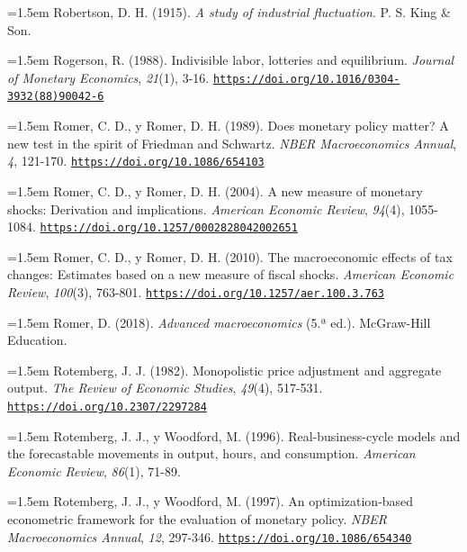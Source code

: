 \documentclass[10pt,a4paper]{article}
\begin{document}
\noindent\hangindent=1.5em Robertson, D. H. (1915). \textit{A study of industrial fluctuation}. P. S. King \& Son.

\noindent\hangindent=1.5em Rogerson, R. (1988). Indivisible labor, lotteries and equilibrium. \textit{Journal of Monetary Economics}, \textit{21}(1), 3-16. \href{https://doi.org/10.1016/0304-3932(88)90042-6}{\nolinkurl{https://doi.org/10.1016/0304-3932(88)90042-6}}

\noindent\hangindent=1.5em Romer, C. D., y Romer, D. H. (1989). Does monetary policy matter? A new test in the spirit of Friedman and Schwartz. \textit{NBER Macroeconomics Annual}, \textit{4}, 121-170. \href{https://doi.org/10.1086/654103}{\nolinkurl{https://doi.org/10.1086/654103}}

\noindent\hangindent=1.5em Romer, C. D., y Romer, D. H. (2004). A new measure of monetary shocks: Derivation and implications. \textit{American Economic Review}, \textit{94}(4), 1055-1084. \href{https://doi.org/10.1257/0002828042002651}{\nolinkurl{https://doi.org/10.1257/0002828042002651}}

\noindent\hangindent=1.5em Romer, C. D., y Romer, D. H. (2010). The macroeconomic effects of tax changes: Estimates based on a new measure of fiscal shocks. \textit{American Economic Review}, \textit{100}(3), 763-801. \href{https://doi.org/10.1257/aer.100.3.763}{\nolinkurl{https://doi.org/10.1257/aer.100.3.763}}

\noindent\hangindent=1.5em Romer, D. (2018). \textit{Advanced macroeconomics} (5.ª ed.). McGraw-Hill Education.

\noindent\hangindent=1.5em Rotemberg, J. J. (1982). Monopolistic price adjustment and aggregate output. \textit{The Review of Economic Studies}, \textit{49}(4), 517-531. \href{https://doi.org/10.2307/2297284}{\nolinkurl{https://doi.org/10.2307/2297284}}

\noindent\hangindent=1.5em Rotemberg, J. J., y Woodford, M. (1996). Real-business-cycle models and the forecastable movements in output, hours, and consumption. \textit{American Economic Review}, \textit{86}(1), 71-89.

\noindent\hangindent=1.5em Rotemberg, J. J., y Woodford, M. (1997). An optimization-based econometric framework for the evaluation of monetary policy. \textit{NBER Macroeconomics Annual}, \textit{12}, 297-346. \href{https://doi.org/10.1086/654340}{\nolinkurl{https://doi.org/10.1086/654340}}
\end{document}
